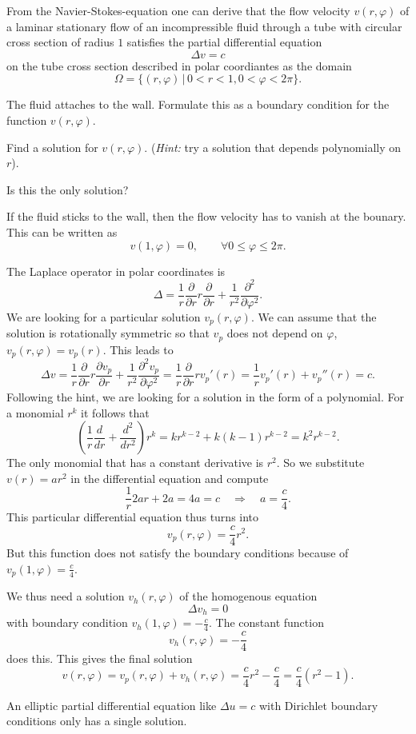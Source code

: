 From the Navier-Stokes-equation one can derive that the
flow velocity $v(r,\varphi)$ of a laminar stationary flow of an
incompressible fluid through a tube with circular cross section
of radius $1$ satisfies the partial differential equation
\[
\Delta v=c
\]
on the tube cross section described in polar coordiantes as the domain
\[
\Omega = \{ (r,\varphi)\,|\,0 < r < 1,0 < \varphi < 2\pi\}.
\]
\begin{teilaufgaben}
\item
The fluid attaches to the wall.
Formulate this as a boundary condition for the function $v(r,\varphi)$.
\item
Find a solution for $v(r,\varphi)$.
({\it Hint:} try a solution that depends polynomially on $r$).
\item
Is this the only solution?
\end{teilaufgaben}

\begin{loesung}
\begin{teilaufgaben}
\item
If the fluid sticks to the wall, then the flow velocity has to 
vanish at the bounary.
This can be written as
\[
v(1,\varphi)=0,\qquad\forall 0\le \varphi\le 2\pi.
\]
\item
The Laplace operator in polar coordinates is
\[
\Delta
=
\frac1r\frac{\partial}{\partial r}r\frac{\partial}{\partial r}
+\frac1{r^2}\frac{\partial^2}{\partial\varphi^2}.
\]
We are looking for a particular solution $v_p(r,\varphi)$.
We can assume that the solution is rotationally symmetric so that
$v_p$ does not depend on $\varphi$, 
$v_p(r,\varphi)=v_p(r)$.
This leads to
\[
\Delta v=
\frac1r\frac{\partial}{\partial r}r
\frac{\partial v_p}{\partial r}
+\frac1{r^2}\frac{\partial^2v_p}{\partial\varphi^2}
=
\frac1r\frac{\partial}{\partial r}rv_p'(r)
=
\frac1rv_p'(r)+v_p''(r)=c.
\]
Following the hint, we are looking for a solution in the form of a
polynomial.
For a monomial $r^k$ it follows that
\[
\left(\frac1r\frac{d}{dr}+\frac{d^2}{dr^2}\right)r^k
=kr^{k-2}+k(k-1)r^{k-2}
=k^2 r^{k-2}.
\]
The only monomial that has a constant derivative is $r^2$.
So we substitute $v(r)=ar^2$ in the differential equation and compute
\[
\frac1r2ar+2a
=
4a
=c
\quad
\Rightarrow
\quad
a=\frac{c}{4}.
\]
This particular differential equation thus turns into
\[
v_p(r,\varphi)=\frac{c}{4}r^2.
\]
But this function does not satisfy the boundary conditions because of
$v_p(1,\varphi)=\frac{c}{4}$.

We thus need a solution $v_h(r,\varphi)$ of the homogenous equation
\[
\Delta v_h=0
\]
with boundary condition $v_h(1,\varphi)=-\frac{c}{4}$.
The constant function
\[
v_h(r,\varphi)=-\frac{c}{4}
\]
does this.
This gives the final solution
\[
v(r,\varphi)=v_p(r,\varphi)+v_h(r,\varphi)=\frac{c}{4}r^2 -\frac{c}{4}=
\frac{c}{4}(r^2-1).
\]
\item
An elliptic partial differential equation like
$\Delta u=c$ with Dirichlet boundary conditions only has a single 
solution.
\qedhere
\end{teilaufgaben}
\end{loesung}
